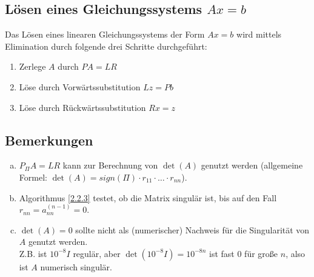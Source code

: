 \documentclass[ngerman,fontsize=11pt, paper=a4, parskip=half, titlepage=true, toc=bib]{scrbook}
\begin{document}
\subsection{Lösen eines Gleichungssystems $Ax=b$} 
Das Lösen eines linearen Gleichungssystems der Form $Ax=b$ wird mittels
Elimination durch folgende drei Schritte durchgeführt:
\begin{enumerate}[1)]
\item Zerlege $A$ durch $PA=LR$
\item Löse durch Vorwärtssubstitution $Lz=Pb$
\item Löse durch Rückwärtssubstitution $Rx=z$
\end{enumerate}

\subsection{Bemerkungen}
\begin{enumerate}[a)]
\item $P_\Pi A=LR$ kann zur Berechnung von $\det(A)$ genutzt werden
  (allgemeine Formel: $\det(A)=sign(\Pi)\cdot r_{11}\cdot \dots \cdot r_{nn}$).
\item Algorithmus \ref{2.2.3}  testet, ob die Matrix singulär ist,
  bis auf den Fall $r_{nn}=a_{nn}^{(n-1)}=0$.
\item $\det(A)=0$ sollte nicht als (numerischer) Nachweis für die
  Singularität von $A$ genutzt werden.\\
  Z.B. ist $10^{-8}I$ regulär, aber $\det(10^{-8}I) = 10^{-8n}$ ist fast 0
  für große $n$, also ist $A$ numerisch singulär.
\end{enumerate}
\end{document}
